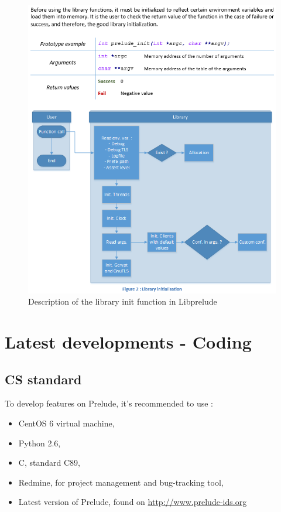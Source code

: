 \documentclass{koala-en}
\begin{document}
\begin{figure}[!ht]
  \center
  \includegraphics{sysop.png}
  \caption{Description of the library init function in Libprelude}
\end{figure}

\thispagestyle{fancy}
\newpage

\chapter{Latest developments - Coding}
\section{CS standard}
To develop features on Prelude, it's recommended to use :
\begin{itemize}
  \item CentOS 6 virtual machine,
  \item Python 2.6,
  \item C, standard C89,
  \item Redmine, for project management and bug-tracking tool,
  \item Latest version of Prelude, found on \url{http://www.prelude-ids.org}
\end{itemize}
\end{document}
